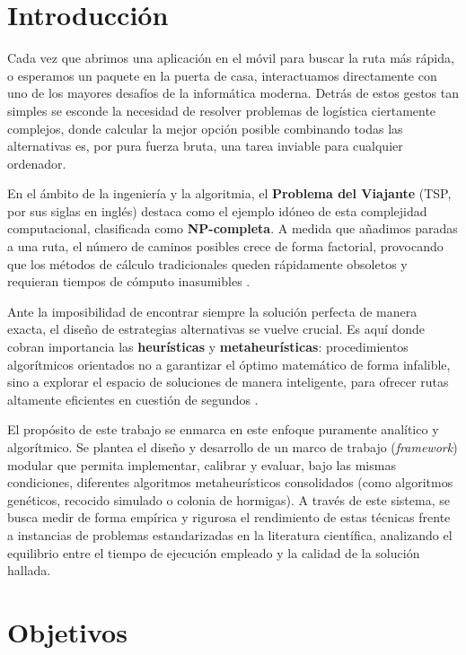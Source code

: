 \documentclass[11pt,a4paper,oneside]{article}
\begin{document}
\section{Introducción}
\label{sec:introduccion}

Cada vez que abrimos una aplicación en el móvil para buscar la ruta más rápida, o esperamos un paquete en la puerta de casa, 
interactuamos directamente con uno de los mayores desafíos de la informática moderna. Detrás de estos gestos tan simples se 
esconde la necesidad de resolver problemas de logística ciertamente complejos, donde calcular la mejor opción posible
combinando todas las alternativas es, por pura fuerza bruta, una tarea inviable para cualquier ordenador.

En el ámbito de la ingeniería y la algoritmia, el \textbf{Problema del Viajante} (TSP, por sus siglas en inglés) destaca como 
el ejemplo idóneo de esta complejidad computacional, clasificada como \textbf{NP-completa}. A medida que añadimos paradas a una
ruta, el número de caminos posibles crece de forma factorial, provocando que los métodos de cálculo tradicionales queden
rápidamente obsoletos y requieran tiempos de cómputo inasumibles \cite{hoffman2001}.

Ante la imposibilidad de encontrar siempre la solución perfecta de manera exacta, el diseño de estrategias alternativas se 
vuelve crucial. Es aquí donde cobran importancia las \textbf{heurísticas} y \textbf{metaheurísticas}: procedimientos algorítmicos
orientados no a garantizar el óptimo matemático de forma infalible, sino a explorar el espacio de soluciones de manera inteligente,
para ofrecer rutas altamente eficientes en cuestión de segundos \cite{halim2019}.

El propósito de este trabajo se enmarca en este enfoque puramente analítico y algorítmico. Se plantea el diseño y desarrollo de
un marco de trabajo (\textit{framework}) modular que permita implementar, calibrar y evaluar, bajo las mismas condiciones, 
diferentes algoritmos metaheurísticos consolidados (como algoritmos genéticos, recocido simulado o colonia de hormigas). A través
de este sistema, se busca medir de forma empírica y rigurosa el rendimiento de estas técnicas frente a instancias de problemas 
estandarizadas en la literatura científica, analizando el equilibrio entre el tiempo de ejecución empleado y la calidad de la
solución hallada.

\section{Objetivos}
\label{sec:objetivos-y-campo}
\end{document}
